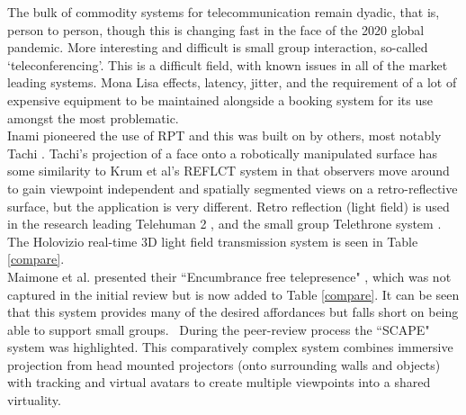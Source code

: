 The bulk of commodity systems for telecommunication remain dyadic, that is, person to person, though this is changing fast in the face of the 2020 global pandemic. More interesting and difficult is small group interaction, so-called `teleconferencing'. This is a difficult field, with known issues in all of the market leading systems. Mona Lisa effects, latency, jitter, and the requirement of a lot of expensive equipment to be maintained alongside a booking system for its use amongst the most problematic.\\
Inami pioneered the use of RPT \cite{inami2000visuo} and this was built on by others, most notably Tachi \cite{Tachi2003, Tachi2004}. Tachi's projection of a face onto a robotically manipulated surface has some similarity to Krum et al's REFLCT system \cite{Krum2012} in that observers move around to gain viewpoint independent and spatially segmented views on a retro-reflective surface, but the application is very different. Retro reflection (light field) is used in the research leading Telehuman 2 \cite{gotsch2018telehuman2}, and the small group Telethrone system \cite{o2018telethrone}. \\

The Holovizio real-time 3D light field transmission system\cite{3dlightfield} is seen in Table \ref{compare}.\\
Maimone et al. presented their ``Encumbrance free telepresence" \cite{6162881}, which was not captured in the initial review but is now added to Table \ref{compare}. It can be seen that this system provides many of the desired affordances but falls short on being able to support small groups. \
During the peer-review process the ``SCAPE" system \cite{1255811} was highlighted. This comparatively complex system combines immersive projection from head mounted projectors (onto surrounding walls and objects) with tracking and virtual avatars to create multiple viewpoints into a shared virtuality.


